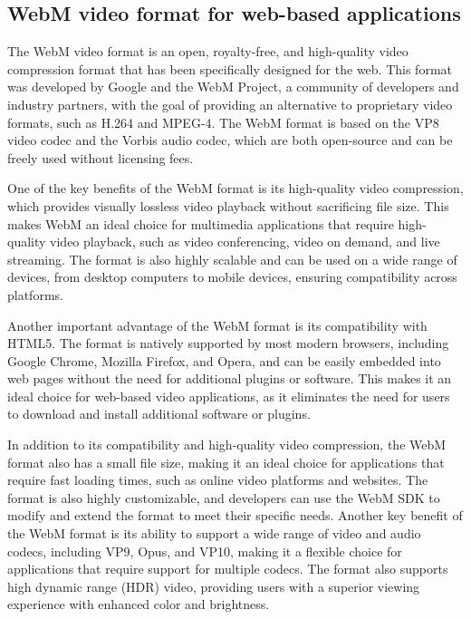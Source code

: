 \subsection{WebM video format for web-based applications}
The WebM video format is an open, royalty-free, and high-quality video compression format 
that has been specifically designed for the web. This format was developed by Google and 
the WebM Project, a community of developers and industry partners, with the goal of 
providing an alternative to proprietary video formats, such as H.264 and MPEG-4. 
The WebM format is based on the VP8 video codec and the Vorbis audio codec, 
which are both open-source and can be freely used without licensing fees.

One of the key benefits of the WebM format is its high-quality video compression, 
which provides visually lossless video playback without sacrificing file size. 
This makes WebM an ideal choice for multimedia applications that require 
high-quality video playback, such as video conferencing, video on demand, and live streaming. The format 
is also highly scalable and can be used on a wide range of devices, from desktop computers to mobile 
devices, ensuring compatibility across platforms.

Another important advantage of the WebM format is its compatibility with HTML5. The format is 
natively supported by most modern browsers, including Google Chrome, Mozilla Firefox, and Opera, 
and can be easily embedded into web pages without the need for additional plugins or software. 
This makes it an ideal choice for web-based video applications, as it eliminates the need for 
users to download and install additional software or plugins.

In addition to its compatibility and high-quality video compression, the WebM format also has 
a small file size, making it an ideal choice for applications that require fast loading times, 
such as online video platforms and websites. The format is also highly customizable, and developers 
can use the WebM SDK to modify and extend the format to meet their specific needs.
Another key benefit of the WebM format is its ability to support a wide range of video and audio 
codecs, including VP9, Opus, and VP10, making it a flexible choice for applications that require 
support for multiple codecs. The format also supports high dynamic range (HDR) video, providing 
users with a superior viewing experience with enhanced color and brightness. \cite{webm}
\\
\\
